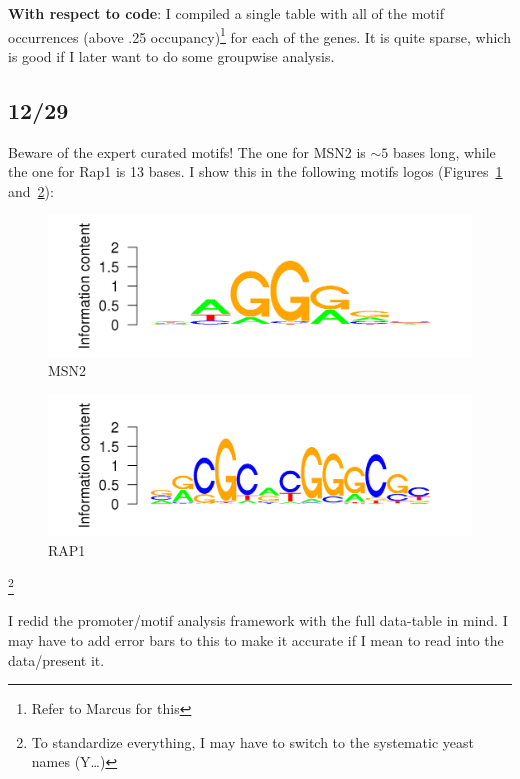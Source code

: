 \documentclass[12pt]{article}\usepackage[]{graphicx}\usepackage[]{color}
\newenvironment{knitrout}{}{} %
\begin{document}
\textbf{With respect to code}:
I compiled a single table with all of the motif occurrences (above .25 occupancy)\footnote{Refer to Marcus for this} for each of the genes. It is quite sparse, which is good if I later want to do some groupwise analysis.

\subsection{12/29}
Beware of the expert curated motifs! The one for MSN2 is $\sim 5$ bases long, while the one for Rap1 is 13 bases. I show this in the following motifs logos (Figures~\ref{fig:logo1} and~\ref{fig:logo2}):

\begin{knitrout}
\color{fgcolor}\begin{figure}[]


{\centering \includegraphics[width=.9\textwidth]{figure/latex-logo1} 

}

\caption[MSN2]{MSN2\label{fig:logo1}}
\end{figure}


\end{knitrout}


\begin{knitrout}
\color{fgcolor}\begin{figure}[]


{\centering \includegraphics[width=.9\textwidth]{figure/latex-logo2} 

}

\caption[RAP1]{RAP1\label{fig:logo2}}
\end{figure}


\end{knitrout}


\footnote{To standardize everything, I may have to switch to the systematic yeast names (Y\ldots)}

I redid the promoter/motif analysis framework with the full data-table in mind. I may have to add error bars to this to make it accurate if I mean to read into the data/present it.
\end{document}
